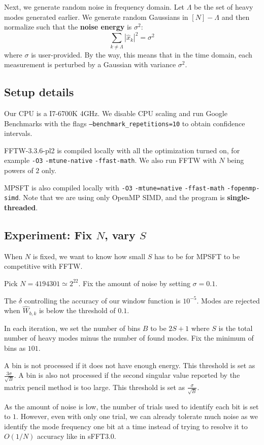 \documentclass[10pt]{article}
\begin{document}
Next, we generate random noise in frequency domain. Let $\Lambda$ be the set of heavy modes generated earlier. We generate random Gaussians in $[N]-\Lambda$ and then normalize such that the \textbf{noise energy} is $\sigma^2$:
$$\sum_{k\neq \Lambda} |\hat{x}_k|^2 = \sigma^2$$
where $\sigma$ is user-provided. By the way, this means that in the time domain, each measurement is perturbed by a Gaussian with variance $\sigma^2$.

\subsection{Setup details}
Our CPU is a I7-6700K 4GHz. We disable CPU scaling and run Google Benchmarks with the flags \texttt{--benchmark\_repetitions=10} to obtain confidence intervals.

FFTW-3.3.6-pl2 is compiled locally with all the optimization turned on, for example \texttt{-O3} \texttt{-mtune-native} \texttt{-ffast-math}. We also run FFTW with $N$ being powers of $2$ only.

MPSFT is also compiled locally with \texttt{-O3} \texttt{-mtune=native} \texttt{-ffast-math} \texttt{-fopenmp-simd}. Note that we are using only OpenMP SIMD, and the program is \textbf{single-threaded}.

\subsection{Experiment: Fix $N$, vary $S$}
When $N$ is fixed, we want to know how small $S$ has to be for MPSFT to be competitive with FFTW.

Pick $N=4194301\simeq 2^{22}$. Fix the amount of noise by setting $\sigma=0.1$.

The $\delta$ controlling the accuracy of our window function is $10^{-5}$. Modes are rejected when $\hat{W}_{b,k}$ is below the threshold of $0.1$.

In each iteration, we set the number of bins $B$ to be $2S+1$ where $S$ is the total number of heavy modes minus the number of found modes. Fix the minimum of bins as $101$.

A bin is not processed if it does not have enough energy. This threshold is set as $\frac{3\sigma}{\sqrt{B}}$. A bin is also not processed if the second singular value reported by the matrix pencil method is too large. This threshold is set as $\frac{\sigma}{\sqrt{B}}$.

As the amount of noise is low, the number of trials used to identify each bit is set to $1$. However, even with only one trial, we can already tolerate much noise as we identify the mode frequency one bit at a time instead of trying to resolve it to $O(1/N)$ accuracy like in sFFT3.0.
\end{document}
